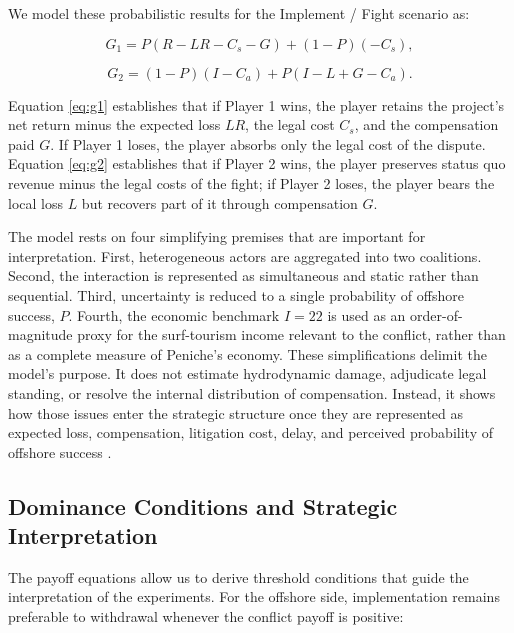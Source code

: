 \documentclass[final,times,authoryear]{elsarticle}
\begin{document}
We model these probabilistic results for the Implement / Fight scenario as:

    \begin{equation}
    G_1 = P(R-LR-C_s-G) + (1-P)(-C_s),
    \label{eq:g1}
    \end{equation}
    
    \begin{equation}
    G_2 = (1-P)(I-C_a) + P(I-L+G-C_a).
    \label{eq:g2}
    \end{equation}

Equation \ref{eq:g1} establishes that if Player 1 wins, the player retains the project's net return minus the expected loss $LR$, the legal cost $C_s$, and the compensation paid $G$. If Player 1 loses, the player absorbs only the legal cost of the dispute. Equation \ref{eq:g2} establishes that if Player 2 wins, the player preserves status quo revenue minus the legal costs of the fight; if Player 2 loses, the player bears the local loss $L$ but recovers part of it through compensation $G$.

The model rests on four simplifying premises that are important for interpretation. First, heterogeneous actors are aggregated into two coalitions. Second, the interaction is represented as simultaneous and static rather than sequential. Third, uncertainty is reduced to a single probability of offshore success, $P$. Fourth, the economic benchmark $I=22$ is used as an order-of-magnitude proxy for the surf-tourism income relevant to the conflict, rather than as a complete measure of Peniche's economy. These simplifications delimit the model's purpose. It does not estimate hydrodynamic damage, adjudicate legal standing, or resolve the internal distribution of compensation. Instead, it shows how those issues enter the strategic structure once they are represented as expected loss, compensation, litigation cost, delay, and perceived probability of offshore success \citep{catf_offshore_delay_2025,resources_litigation_permitting_2025}.

\subsection{Dominance Conditions and Strategic Interpretation}

The payoff equations allow us to derive threshold conditions that guide the interpretation of the experiments. For the offshore side, implementation remains preferable to withdrawal whenever the conflict payoff is positive:
\end{document}
